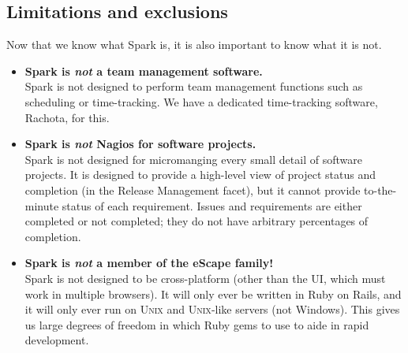 \subsection{Limitations and exclusions}
\subsectionrule

Now that we know what Spark is, it is also important to know what it is not.

\begin{itemize}
\item{\textbf{Spark is \textit{not} a team management software.} \\
	Spark is not designed to perform team management functions such as scheduling or time-tracking. We have a dedicated time-tracking software, Rachota, for this.}
\item{\textbf{Spark is \textit{not} Nagios for software projects.} \\
	Spark is not designed for micromanging every small detail of software projects. It is designed to provide a high-level view of project status and completion (in the Release Management facet), but it cannot provide to-the-minute status of each requirement. Issues and requirements are either completed or not completed; they do not have arbitrary percentages of completion.}
\item{\textbf{Spark is \textit{not} a member of the eScape family!} \\
	Spark is not designed to be cross-platform (other than the UI, which must work in multiple browsers). It will only ever be written in Ruby on Rails, and it will only ever run on \textsc{Unix} and \textsc{Unix}-like servers (not Windows). This gives us large degrees of freedom in which Ruby gems to use to aide in rapid development.}
\end{itemize}